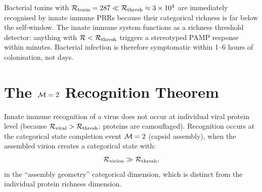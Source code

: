 \begin{corollary}
\label{cor:bacteria_immediate}
Bacterial toxins with $\mathcal{R}_{\mathrm{toxin}} = 287 \ll \mathcal{R}_{\mathrm{thresh}} \approx 3 \times 10^4$
are immediately recognised by innate immune PRRs because their categorical
richness is far below the self-window. The innate immune system functions as
a richness threshold detector: anything with $\mathcal{R} < \mathcal{R}_{\mathrm{thresh}}$
triggers a stereotyped PAMP response within minutes. Bacterial infection
is therefore symptomatic within 1--6 hours of colonisation, not days.
\end{corollary}

\section{The $\Depth = 2$ Recognition Theorem}
\label{sec:depth2_recognition}

\begin{theorem}[Immune Recognition at $\Depth = 2$ Completion]
\label{thm:depth2_recognition}
Innate immune recognition of a virus does not occur at individual viral protein
level (because $\mathcal{R}_{\mathrm{viral}} > \mathcal{R}_{\mathrm{thresh}}$: proteins
are camouflaged). Recognition occurs at the categorical state completion event
$\Depth = 2$ (capsid assembly), when the assembled virion creates a categorical
state with:
\begin{equation}
  \mathcal{R}_{\mathrm{virion}} \gg \mathcal{R}_{\mathrm{thresh}},
  \label{eq:virion_richness}
\end{equation}
in the ``assembly geometry'' categorical dimension, which is distinct from
the individual protein richness dimension.
\end{theorem}

